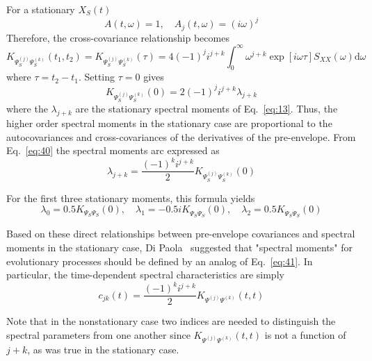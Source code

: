 \documentclass[12pt]{article}
\begin{document}
For a stationary $X_{S}(t)$
\begin{equation}
A(t, \omega)=1, \quad A_{j}(t, \omega)=(i \omega)^{j}
\label{eq:38}
\end{equation}
Therefore, the cross-covariance relationship becomes
\begin{equation}
K_{\Psi_{S}^{(j)} \Psi_{S}^{(k)}}(t_{1}, t_{2})=K_{\Psi_{S}^{(j)} \Psi_{S}^{(k)}}(\tau)=4(-1)^{j} i^{j+k} \int_{0}^{\infty} \omega^{j+k} \exp [i \omega \tau] S_{X X}(\omega) \mathrm{d} \omega
\label{eq:39}
\end{equation}
where $\tau=t_{2}-t_{1}$. Setting $\tau=0$ gives
\begin{equation}
K_{\Psi_{S}^{(j)} \Psi_{S}^{(k)}}(0)=2(-1)^{j} i^{j+k} \lambda_{j+k}
\label{eq:40}
\end{equation}
where the $\lambda_{j+k}$ are the stationary spectral moments of Eq.~\eqref{eq:13}. Thus, the higher order spectral moments in the stationary case are proportional to the autocovariances and cross-covariances of the derivatives of the pre-envelope. From Eq.~\eqref{eq:40} the spectral moments arc expressed as
\begin{equation}
\lambda_{j+k}=\frac{(-1)^{k} i^{j+k}}{2} K_{\Psi_{S}^{(j)} \Psi_{S}^{(k)}}(0)
\label{eq:41}
\end{equation}

For the first three stationary moments, this formula yields
\begin{equation}
\lambda_{0}=0.5 K_{\Psi_{S} \Psi_{S}}(0), \quad \lambda_{1}=-0.5 i K_{\Psi_{S} \dot{\Psi}_{S}}(0), \quad \lambda_{2}=0.5 K_{\dot{\Psi}_{S} \dot{\Psi}_{S}}(0)
\label{eq:42}
\end{equation}

Based on these direct relationships between pre-envelope covariances and spectral moments in the stationary case, Di Paola~\cite{DiPaola1985} suggested that "spectral moments" for evolutionary processes should be defined by an analog of Eq.~\eqref{eq:41}. In particular, the time-dependent spectral characteristics are simply
\begin{equation}
c_{j k}(t)=\frac{(-1)^{k} i^{j+k}}{2} K_{\Psi^{(j)} \Psi^{(k)}}(t, t)
\label{eq:43}
\end{equation}

Note that in the nonstationary case two indices are needed to distinguish the spectral parameters from one another since $K_{\Psi^{(j)} \Psi^{(k)}}(t, t)$ is not a function of $j
+k$, as was true in the stationary case.
\end{document}
